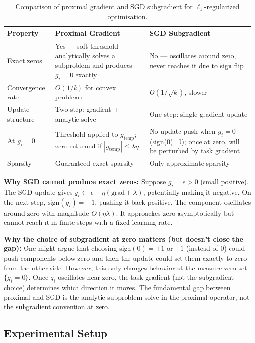\documentclass[12pt,a4paper]{article}
\theoremstyle{definition}
\begin{document}
\begin{table}[H]
\centering
\caption{Comparison of proximal gradient and SGD subgradient for $\ell_1$-regularized optimization.}
\label{tab:optimizer_comparison}
\begin{tabular}{p{4cm}p{5cm}p{5cm}}
\toprule
\textbf{Property} & \textbf{Proximal Gradient} & \textbf{SGD Subgradient} \\
\midrule
Exact zeros & Yes — soft-threshold analytically solves a subproblem and produces $g_i = 0$ exactly & No — oscillates around zero, never reaches it due to sign flip \\
\addlinespace
Convergence rate & $O(1/k)$ for convex problems & $O(1/\sqrt{k})$, slower \\
\addlinespace
Update structure & Two-step: gradient + analytic solve & One-step: single gradient update \\
\addlinespace
At $g_i = 0$ & Threshold applied to $g_{\text{temp}}$; zero returned if $|g_{\text{temp}}| \leq \lambda\eta$ & No update push when $g_i = 0$ (sign(0)=0); once at zero, will be perturbed by task gradient \\
\addlinespace
Sparsity & Guaranteed exact sparsity & Only approximate sparsity \\
\bottomrule
\end{tabular}
\end{table}

\textbf{Why SGD cannot produce exact zeros:} Suppose $g_i = \epsilon > 0$ (small positive). The SGD update gives $g_i \leftarrow \epsilon - \eta(\text{grad} + \lambda)$, potentially making it negative. On the next step, $\text{sign}(g_i) = -1$, pushing it back positive. The component oscillates around zero with magnitude $O(\eta\lambda)$. It approaches zero asymptotically but cannot reach it in finite steps with a fixed learning rate.

\textbf{Why the choice of subgradient at zero matters (but doesn't close the gap):} One might argue that choosing sign$(0) = +1$ or $-1$ (instead of 0) could push components below zero and then the update could set them exactly to zero from the other side. However, this only changes behavior at the measure-zero set $\{g_i = 0\}$. Once $g_i$ oscillates near zero, the task gradient (not the subgradient choice) determines which direction it moves. The fundamental gap between proximal and SGD is the analytic subproblem solve in the proximal operator, not the subgradient convention at zero.

\subsection{Experimental Setup}
\end{document}

